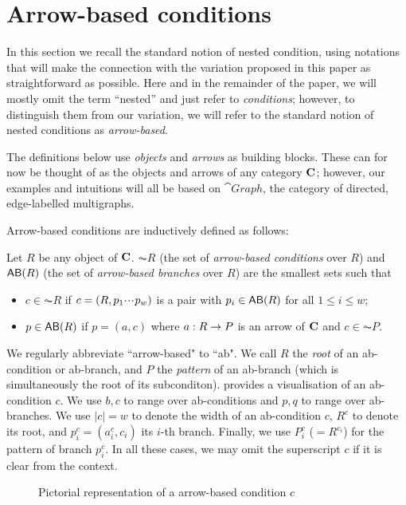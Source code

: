 \section{Arrow-based conditions}

In this section we recall the standard notion of nested condition, using notations that will make the connection with the variation proposed in this paper as straightforward as possible. Here and in the remainder of the paper, we will mostly omit the term ``nested'' and just refer to \emph{conditions}; however, to distinguish them from our variation, we will refer to the standard notion of nested conditions as \emph{arrow-based}.

The definitions below use \emph{objects} and \emph{arrows} as building blocks. These can for now be thought of as the objects and arrows of any category $\mathbf{C}$; however, our examples and intuitions will all be based on $\cat{Graph}$, the category of directed, edge-labelled multigraphs. 

Arrow-based conditions are inductively defined as follows:

\begin{definition}
  Let $R$ be any object of $\mathbf{C}$. $\AC R$ (the set of \emph{arrow-based conditions} over $R$) and $\AB R$ (the set of \emph{arrow-based branches} over $R$) are the smallest sets such that
  \begin{itemize}
  \item $c\in \AC R$ if $c=(R,p_1{\cdotp\mkern-2mu\cdotp\mkern-2mu\cdotp\mkern1mu} p_w)$ is a pair with $p_i\in \AB R$ for all $1\leq i\leq w$;
  \item $p\in \AB R$ if $p=(a,c)$ where $a: R\rightarrow P$ is an arrow of $\mathbf{C}$ and $c\in \AC P$.
  \end{itemize}
\end{definition}
%
We regularly abbreviate ``arrow-based" to ``ab". We call $R$ the \emph{root} of an ab-condition or ab-branch, and $P$ the \emph{pattern} of an ab-branch (which is simultaneously the root of its subconditon).  provides a visualisation of an ab-condition $c$. We use $b,c$ to range over ab-conditions and $p,q$ to range over ab-branches. We use $|c|=w$ to denote the width of an ab-condition $c$, $R^c$ to denote its root, and $p^c_i=(a^c_i,c_i)$ its $i$-th branch. Finally, we use $P^c_i$ ($=R^{c_i}$) for the pattern of branch $p^c_i$. In all these cases, we may omit the superscript $c$ if it is clear from the context.
%
\begin{figure}
  \centering
  
  \caption{Pictorial representation of a arrow-based condition $c$}
\end{figure}

